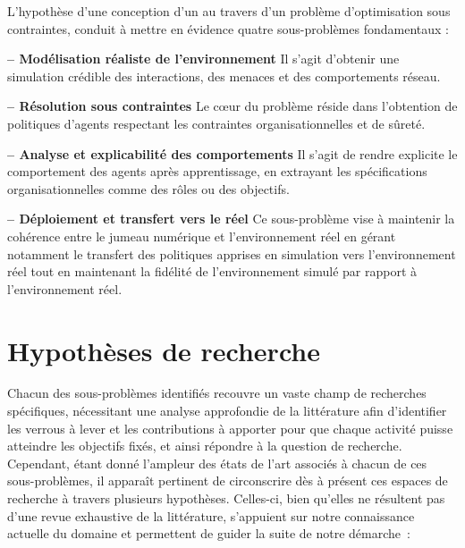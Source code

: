 L'hypothèse d'une conception d'un  au travers d'un problème d'optimisation sous contraintes, conduit à mettre en évidence quatre sous-problèmes fondamentaux :

\medskip
\noindent
\textbf{ -- Modélisation réaliste de l'environnement}
Il s'agit d'obtenir une simulation crédible des interactions, des menaces et des comportements réseau.

\medskip
\noindent
\textbf{ -- Résolution sous contraintes}
Le cœur du problème réside dans l'obtention de politiques d'agents respectant les contraintes organisationnelles et de sûreté.

\medskip
\noindent
\textbf{ -- Analyse et explicabilité des comportements}
Il s'agit de rendre explicite le comportement des agents après apprentissage, en extrayant les spécifications organisationnelles comme des rôles ou des objectifs.

\medskip
\noindent
\textbf{ -- Déploiement et transfert vers le réel}
Ce sous-problème vise à maintenir la cohérence entre le jumeau numérique et l'environnement réel en gérant notamment le transfert des politiques apprises en simulation vers l'environnement réel tout en maintenant la fidélité de l'environnement simulé par rapport à l'environnement réel.

\clearpage

\section{Hypothèses de recherche}

Chacun des sous-problèmes identifiés recouvre un vaste champ de recherches spécifiques, nécessitant une analyse approfondie de la littérature afin d'identifier les verrous à lever et les contributions à apporter pour que chaque activité puisse atteindre les objectifs fixés, et ainsi répondre à la question de recherche. Cependant, étant donné l'ampleur des états de l'art associés à chacun de ces sous-problèmes, il apparaît pertinent de circonscrire dès à présent ces espaces de recherche à travers plusieurs hypothèses. Celles-ci, bien qu'elles ne résultent pas d'une revue exhaustive de la littérature, s'appuient sur notre connaissance actuelle du domaine et permettent de guider la suite de notre démarche~:

